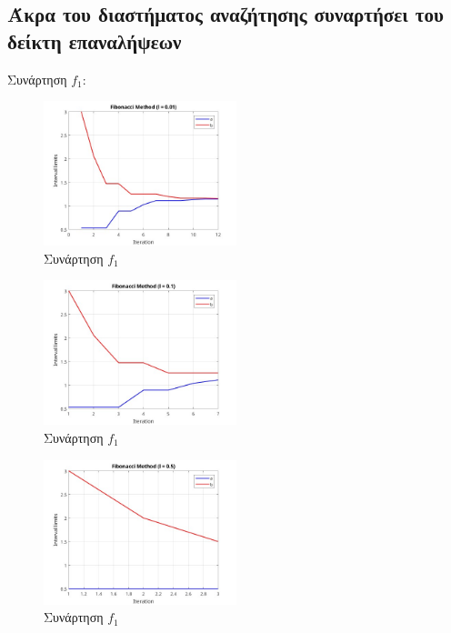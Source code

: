 \subsection{Άκρα του διαστήματος αναζήτησης συναρτήσει του δείκτη επαναλήψεων}
Συνάρτηση $f_1$:
\begin{figure}[H] %
    \centering
    \includegraphics[width=0.5\textwidth]{media/fibonaccif1_001} %
    \caption{Συνάρτηση $f_1$}
\end{figure}
\begin{figure}[H] %
    \centering
    \includegraphics[width=0.5\textwidth]{media/fibonaccif1_01} %
    \caption{Συνάρτηση $f_1$}
\end{figure}
\begin{figure}[H] %
    \centering
    \includegraphics[width=0.5\textwidth]{media/fibonaccif1_05} %
    \caption{Συνάρτηση $f_1$}
\end{figure}

